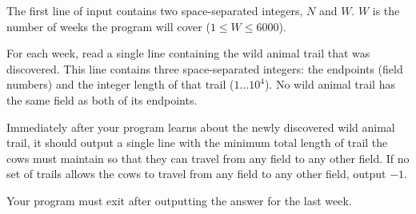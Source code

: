 The first line of input contains two space-separated integers, $N$ and $W$. $W$ is the number of weeks the program will cover ($1 \le W \le 6000$).

For each week, read a single line containing the wild animal trail that was discovered. This line contains three space-separated integers: the endpoints (field numbers) and the integer length of that trail ($1 \ldots 10^4$). No wild animal trail has the same field as both of its endpoints.

Immediately after your program learns about the newly discovered wild animal trail, it should output a single line with the minimum total length of trail the cows must maintain
so that they can travel from any field to any other field. If no set of trails allows the cows to travel from any field to any other field, output $-1$.

Your program must exit after outputting the answer for the last week.

